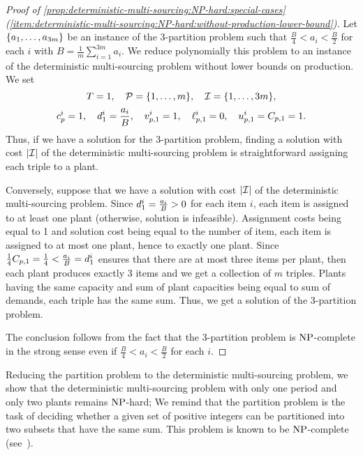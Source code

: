 \begin{proof}[Proof of \cref{prop:deterministic-multi-sourcing:NP-hard:special-cases} (\cref{item:deterministic-multi-sourcing:NP-hard:without-production-lower-bound})]
Let $\crbracket{a_1,\ldots,a_{3m}}$ be an instance of the 3-partition problem such that $\frac{B}{4} < a_i < \frac{B}{2}$ for each $i$ with $B=\frac{1}{m}\sum_{i=1}^{3m}a_i$.
We reduce polynomially this problem to an instance of the deterministic multi-sourcing problem without lower bounds on production.
We set
$$
  \horizon=1
  ,\quad
  \plants=\range[1]{m}
  ,\quad
  \REF=\range[1]{3m},
$$
$$
  c_p^i=1
  ,\quad
  d_1^i=\frac{a_i}{B}
  ,\quad
  v_{p,1}^i=1
  ,\quad
  \ell_{p,1}^i=0
  ,\quad
  u_{p,1}^i=C_{p,1}=1.
$$
Thus, if we have a solution for the 3-partition problem, finding a solution with cost $\card{\REF}$ of the deterministic multi-sourcing problem is straightforward assigning each triple to a plant.

Conversely, suppose that we have a solution with cost $\card{\REF}$ of the deterministic multi-sourcing problem.
Since $d_1^i=\frac{a_i}{B}>0$ for each item $i$, each item is assigned to at least one plant (otherwise, solution is infeasible).
Assignment costs being equal to 1 and solution cost being equal to the number of item, each item is assigned to at most one plant, hence to exactly one plant.
Since $\frac{1}{4}C_{p,1}=\frac{1}{4} < \frac{a_i}{B} = d_1^i$ ensures that there are at most three items per plant, then each plant produces exactly 3 items and we get a collection of $m$ triples.
Plants having the same capacity and sum of plant capacities being equal to sum of demands, each triple has the same sum.
Thus, we get a solution of the 3-partition problem.

The conclusion follows from the fact that the 3-partition problem is $\operatorname{NP}$-complete in the strong sense even if $\frac{B}{4} < a_i < \frac{B}{2}$ for each $i$.
\end{proof}




Reducing the partition problem to the deterministic multi-sourcing problem, we show that the deterministic multi-sourcing problem with only one period and only two plants remains $\operatorname{NP}$-hard;
We remind that the partition problem is the task of deciding whether a given set of positive integers can be partitioned into two subsets that have the same sum.
This problem is known to be $\operatorname{NP}$-complete (see~\citet{Garey1979}).


